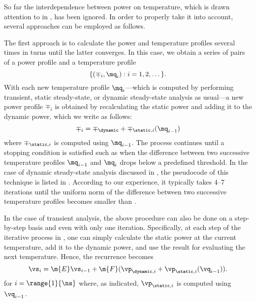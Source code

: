 So far the interdependence between power on temperature, which is drawn
attention to in , has been ignored. In order to properly take
it into account, several approaches can be employed as follows.

The first approach is to calculate the power and temperature profiles several
times in turns until the latter converges. In this case, we obtain a series of
pairs of a power profile and a temperature profile
\[
  \{ (\mp_i, \mq_i): i = 1, 2, \dots \}.
\]
With each new temperature profile $\mq_i$---which is computed by performing
transient, static steady-state, or dynamic steady-state analysis as usual---a
new power profile $\mp_i$ is obtained by recalculating the static power and
adding it to the dynamic power, which we write as follows:
\[
  \mp_i = \mp_\dynamic + \mp_{\static, i}(\mq_{i - 1})
\]
where $\mp_{\static, i}$ is computed using $\mq_{i - 1}$. The process continues
until a stopping condition is satisfied such as when the difference between two
successive temperature profiles $\mq_{i - 1}$ and $\mq_i$ drops below a
predefined threshold. In the case of dynamic steady-state analysis discussed in
, the pseudocode of this technique is listed
in . According to our experience, it
typically takes 4--7 iterations until the uniform norm of the difference between
two successive temperature profiles becomes smaller than .

In the case of transient analysis, the above procedure can also be done on a
step-by-step basis and even with only one iteration. Specifically, at each step
of the iterative process in , one can simply
calculate the static power at the current temperature, add it to the dynamic
power, and use the result for evaluating the next temperature. Hence, the
recurrence becomes
\[
  \vs_i = \m{E} \vs_{i - 1} + \m{F} (\vp_{\dynamic, i} + \vp_{\static, i}(\vq_{i - 1})).
\]
for $i = \range{1}{\ns}$ where, as indicated, $\vp_{\static, i}$ is computed
using $\vq_{i - 1}$.

